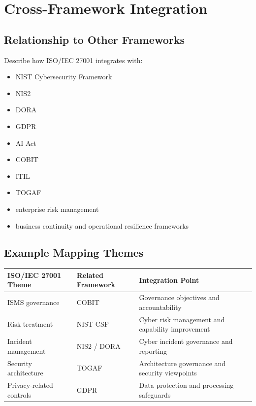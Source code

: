 \documentclass[
  letterpaper,
  DIV=11,
  numbers=noendperiod]{scrartcl}
\providecommand{\tightlist}{%
  \setlength{\itemsep}{0pt}\setlength{\parskip}{0pt}}
\begin{document}
\section{Cross-Framework Integration}\label{cross-framework-integration}

\subsection{Relationship to Other
Frameworks}\label{relationship-to-other-frameworks}

Describe how ISO/IEC 27001 integrates with:

\begin{itemize}
\tightlist
\item
  NIST Cybersecurity Framework
\item
  NIS2
\item
  DORA
\item
  GDPR
\item
  AI Act
\item
  COBIT
\item
  ITIL
\item
  TOGAF
\item
  enterprise risk management
\item
  business continuity and operational resilience frameworks
\end{itemize}

\subsection{Example Mapping Themes}\label{example-mapping-themes}

\begin{longtable}[]{@{}
  >{\raggedright\arraybackslash}p{}
  >{\raggedright\arraybackslash}p{}
  >{\raggedright\arraybackslash}p{}@{}}
\toprule\noalign{}
\begin{minipage}[b]{\linewidth}\raggedright
ISO/IEC 27001 Theme
\end{minipage} & \begin{minipage}[b]{\linewidth}\raggedright
Related Framework
\end{minipage} & \begin{minipage}[b]{\linewidth}\raggedright
Integration Point
\end{minipage} \\
\midrule\noalign{}
\endhead
\bottomrule\noalign{}
\endlastfoot
ISMS governance & COBIT & Governance objectives and accountability \\
Risk treatment & NIST CSF & Cyber risk management and capability
improvement \\
Incident management & NIS2 / DORA & Cyber incident governance and
reporting \\
Security architecture & TOGAF & Architecture governance and security
viewpoints \\
Privacy-related controls & GDPR & Data protection and processing
safeguards \\
\end{longtable}
\end{document}
